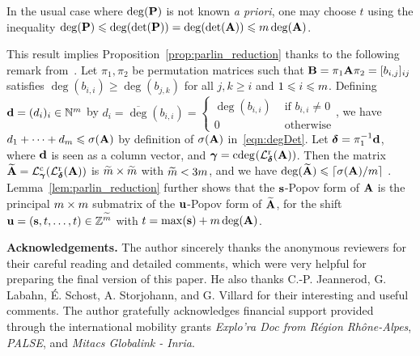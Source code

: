 \documentclass[preprint]{sig-alternate-05-2015}
\begin{document}
\vspace{-0.15cm}
In the usual case where $\deg(\popov)$ is not known \emph{a priori}, one may
choose $t$ using the inequality $\deg(\popov) \le \deg(\det(\popov)) =
\deg(\det(\mat{A})) \le \rdim \deg(\mat{A})$. 

This result implies Proposition~\ref{prop:parlin_reduction}
thanks to the following remark from~\cite{GuSaStVa12}. Let $\pi_1,\pi_2$ be
permutation matrices such that $\mat{B} = \pi_1\mat{A}\pi_2 = [b_{i,j}]_{ij}$
satisfies
$\deg(b_{i,i}) \ge \deg(b_{j,k})$ for all $j,k\ge i$ and $1\le i\le \rdim$.
Defining $\shifts[d] = (d_i)_i \in \NN^\rdim$ by
$d_{i} = \overline{\deg}(b_{i,i}) = \left\{ \begin{array}{ll}
  \deg(b_{i,i}) & \text{ if } b_{i,i} \neq 0 \\
  0  & \text{ otherwise}
\end{array} \right.$,
we have $d_1 + \cdots + d_\rdim \le \degDet$ by definition of $\degDet$
in~\eqref{eqn:degDet}. Let $\minDegs = \pi_1^{-1} \shifts[d]$, where
$\shifts[d]$ is seen as a column vector, and $\boldsymbol\gamma =
\cdeg{\rowParLin{\minDegs}{\mat{A}}}$. Then the matrix $\expand{\mat{A}} =
\colParLin{\boldsymbol\gamma}{\rowParLin{\minDegs}{\mat{A}}}$ is
$\expand{\rdim} \times \expand{\rdim}$ with $\expand{\rdim} < 3\rdim$, and we
have $\deg(\expand{\mat{A}}) \le \lceil \degDet/\rdim \rceil$ \cite[Corollary
3]{GuSaStVa12}.  Lemma~\ref{lem:parlin_reduction} further shows that the
$\shifts$-Popov form of $\mat{A}$ is the principal $\rdim \times \rdim$
submatrix of the $\shifts[u]$-Popov form of $\expand{\mat{A}}$, for the shift
$\shifts[u] = (\shifts,t,\ldots,t) \in \shiftSpace[\expand{\rdim}]$ with $t =
\max(\shifts) + \rdim \deg(\mat{A})$.

\medskip \textbf{Acknowledgements.} The author sincerely thanks the anonymous
reviewers for their careful reading and detailed comments, which were very
helpful for preparing the final version of this paper. He also thanks C.-P.
Jeannerod, G. Labahn, \'E. Schost, A. Storjohann, and G. Villard for their
interesting and useful comments. The author gratefully acknowledges financial
support provided through the international mobility grants \emph{Explo'ra Doc
from R\'egion Rh\^one-Alpes}, \emph{PALSE}, and \emph{Mitacs Globalink -
Inria}.
\end{document}

